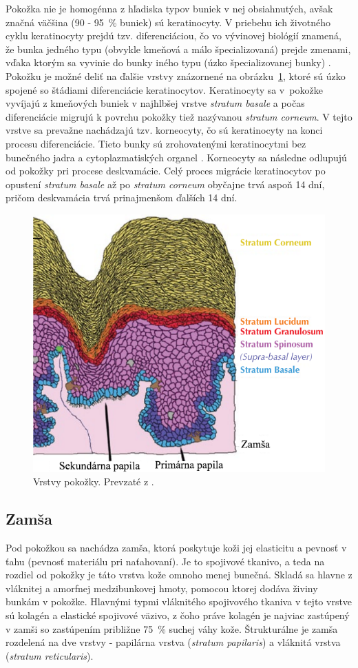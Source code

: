   Pokožka nie je homogénna z hľadiska typov buniek v nej obsiahnutých, avšak značná väčšina (90 - 95~\% buniek) sú keratinocyty. V priebehu
  ich životného cyklu keratinocyty prejdú tzv. diferenciáciou, čo vo vývinovej biológií znamená, že bunka jedného typu (obvykle kmeňová a  málo špecializovaná)
  prejde zmenami, vďaka ktorým sa vyvinie do bunky iného typu (úzko špecializovanej bunky) \cite{slack2012biology}. Pokožku je možné deliť na ďalšie
  vrstvy znázornené na obrázku~{\ref{obr:pokozka_vrstvy}}, ktoré sú úzko spojené so štádiami diferenciácie keratinocytov. Keratinocyty sa v~pokožke vyvíjajú
  z kmeňových buniek v najhlbšej vrstve \emph{stratum basale} a počas diferenciácie migrujú k povrchu pokožky tiež nazývanou \emph{stratum corneum}. V tejto vrstve sa
  prevažne nachádzajú tzv. korneocyty, čo sú keratinocyty na konci procesu diferenciácie. Tieto bunky sú zrohovatenými keratinocytmi bez bunečného jadra
  a cytoplazmatiských organel \cite{koster2009epidermis}. Korneocyty sa následne odlupujú od pokožky pri procese deskvamácie. Celý proces migrácie
  keratinocytov po opustení \emph{stratum basale} až po \emph{stratum corneum} obyčajne trvá aspoň 14 dní, pričom deskvamácia trvá prinajmenšom ďalších 14 dní.

  \begin{figure}[h]
    \centering
    \includegraphics[width=0.65\linewidth]{obrazky-figures/pokozka_vrstvy.png}
    \caption{Vrstvy pokožky. Prevzaté z \cite{FingerprintSrcBook}.}
    \label{obr:pokozka_vrstvy}
  \end{figure}

  \subsection{Zamša}
  Pod pokožkou sa nachádza zamša, ktorá poskytuje koži jej elasticitu a pevnosť v ťahu (pevnosť materiálu pri naťahovaní). Je to spojivové tkanivo,
  a teda na rozdiel od pokožky je táto vrstva kože omnoho menej bunečná. Skladá sa hlavne z vláknitej a amorfnej medzibunkovej hmoty, pomocou ktorej dodáva
  živiny bunkám v pokožke. Hlavnými typmi vláknitého spojivového tkaniva v tejto vrstve sú kolagén a elastické spojivové väzivo, z čoho práve kolagén je
  najviac zastúpený v zamši so zastúpením približne 75~\% suchej váhy kože. Štrukturálne je zamša rozdelená na dve vrstvy - papilárna vrstva
  (\emph{stratum papilaris}) a vláknitá vrstva (\emph{stratum reticularis}).

